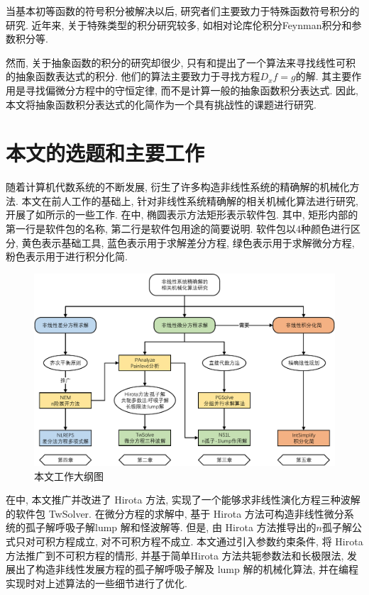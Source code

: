 当基本初等函数的符号积分被解决以后, 研究者们主要致力于特殊函数符号积分的研究\cite{cherry1985,cherry1986,bertrand1994,jeffrey1997}. 近年来, 关于特殊类型的积分研究较多, 如相对论库伦积分\cite{paule2012,paule2013}\D Feynman积分\cite{blumlein2012,smirnov2015}和参数积分\cite{raab2016}等.

然而, 关于抽象函数的积分的研究却很少, 只有和提出了一个算法来寻找线性可积的抽象函数表达式的积分. 他们的算法主要致力于寻找方程$D_x f=g$的解. 其主要作用是寻找偏微分方程中的守恒定律\cite{poole2011}, 而不是计算一般的抽象函数积分表达式. 因此, 本文将抽象函数积分表达式的化简作为一个具有挑战性的课题进行研究.

\section{本文的选题和主要工作}
随着计算机代数系统的不断发展, 衍生了许多构造非线性系统的精确解的机械化方法. 本文在前人工作的基础上, 针对非线性系统精确解的相关机械化算法进行研究, 开展了如所示的一些工作. 在中, 椭圆表示方法\D 矩形表示软件包. 其中, 矩形内部的第一行是软件包的名称, 第二行是软件包用途的简要说明. 软件包以4种颜色进行区分, 黄色表示基础工具, 蓝色表示用于求解差分方程, 绿色表示用于求解微分方程, 粉色表示用于进行积分化简. 

\begin{figure}[htbp]
\includegraphics[width=\textwidth]{fig/outline.pdf}
\caption{本文工作大纲图}\label{outline}
\end{figure}

在中, 本文推广并改进了 Hirota 方法, 实现了一个能够求非线性演化方程三种波解的软件包 TwSolver. 在微分方程的求解中, 基于 Hirota 方法可构造非线性微分系统的孤子解\D 呼吸子解\D lump 解和怪波解等. 但是, 由 Hirota 方法推导出的$n$孤子解公式只对可积方程成立, 对不可积方程不成立. 本文通过引入参数约束条件, 将 Hirota 方法推广到不可积方程的情形, 并基于简单Hirota 方法\D 共轭参数法和长极限法, 发展出了构造非线性发展方程的孤子解\D 呼吸子解及 lump 解的机械化算法, 并在编程实现时对上述算法的一些细节进行了优化. 

